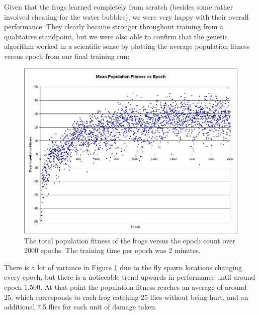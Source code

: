 Given that the frogs learned completely from scratch (besides some rather involved cheating for the water bubbles), we were very happy with their overall performance. They clearly became stronger throughout training from a qualitative standpoint, but we were also able to confirm that the genetic algorithm worked in a scientific sense by plotting the average population fitness versus epoch from our final training run:\\

\begin{figure}[!htbp]
    \centering
    \includegraphics[scale=0.55]{Figs/FrogFitness.png}
    \caption{The total population fitness of the frogs versus the epoch count over 2000 epochs. The training time per epoch was 2 minutes.}
    \label{fig:FrogFitness}
\end{figure}

There is a lot of variance in Figure \ref{fig:FrogFitness} due to the fly spawn locations changing every epoch, but there is a noticeable trend upwards in performance until around epoch 1,500. At that point the population fitness reaches an average of around 25, which corresponds to each frog catching 25 flies without being hurt, and an additional 7.5 flies for each unit of damage taken.